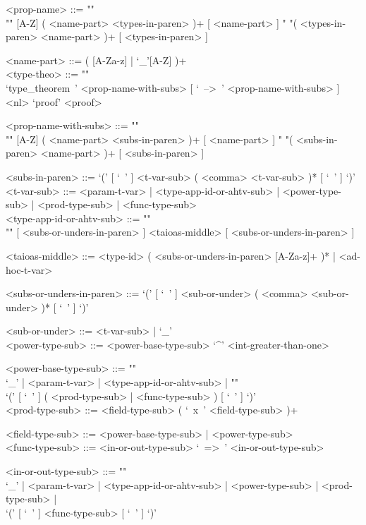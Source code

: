\documentclass[diploma]{softlab-thesis}
\begin{document}
\begin{grammar}
<prop-name> ::=  ""\\""
[A-Z] ( <name-part> <types-in-paren> )+ [ <name-part> ]
\alt " "( <types-in-paren> <name-part> )+ [ <types-in-paren> ]

<name-part> ::= ( [A-Za-z] | `_'[A-Z] )+
\\

\newpage
<type-theo> ::= ""\\
`type_theorem\ ' <prop-name-with-subs> [ `\ -->\ ' <prop-name-with-subs> ] <nl>
`proof' <proof>

<prop-name-with-subs> ::=  ""\\""
[A-Z] ( <name-part> <subs-in-paren> )+ [ <name-part> ]
\alt " "( <subs-in-paren> <name-part> )+ [ <subs-in-paren> ]

<subs-in-paren> ::=
`(' [ `\ ' ] <t-var-sub> ( <comma> <t-var-sub> )* [ `\ ' ] `)'
\\

<t-var-sub> ::=
<param-t-var> | <type-app-id-or-ahtv-sub> | <power-type-sub> | <prod-type-sub> |
<func-type-sub>
\\

<type-app-id-or-ahtv-sub> ::= ""\\""
[ <subs-or-unders-in-paren> ] <taioas-middle> [ <subs-or-unders-in-paren> ]

<taioas-middle> ::=
<type-id> ( <subs-or-unders-in-paren> [A-Za-z]+ )* | <ad-hoc-t-var>

<subs-or-unders-in-paren> ::=
`(' [ `\ ' ] <sub-or-under> ( <comma> <sub-or-under> )* [ `\ ' ] `)'

<sub-or-under> ::= <t-var-sub> | `_'
\\

<power-type-sub> ::= <power-base-type-sub> `^' <int-greater-than-one>

<power-base-type-sub> ::= ""\\
`_' | <param-t-var> | <type-app-id-or-ahtv-sub> | ""\\
`(' [ `\ ' ] ( <prod-type-sub> | <func-type-sub> ) [ `\ ' ] `)'
\\

<prod-type-sub> ::= <field-type-sub> ( `\ x\ ' <field-type-sub> )+

<field-type-sub> ::= <power-base-type-sub> | <power-type-sub>
\\

<func-type-sub> ::= <in-or-out-type-sub> `\ =>\ ' <in-or-out-type-sub>

<in-or-out-type-sub> ::= ""\\
`_' | <param-t-var> | <type-app-id-or-ahtv-sub> | <power-type-sub> |
<prod-type-sub> | \\`(' [ `\ ' ] <func-type-sub> [ `\ ' ] `)'
\\


\end{grammar}
\end{document}
